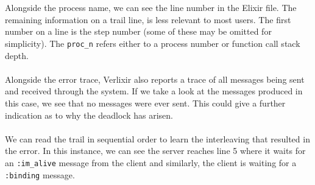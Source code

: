 \\ \\
Alongside the process name, we can see the line number in the Elixir file. The remaining information on a trail line, is less relevant to most users. The first number on a line is the step number (some of these may be omitted for simplicity). The \texttt{proc\_n} refers either to a process number or function call stack depth.
\\ \\
Alongside the error trace, Verlixir also reports a trace of all messages being sent and received through the system. If we take a look at the messages produced in this case, we see that no messages were ever sent. This could give a further indication as to why the deadlock has arisen.
\\ \\
We can read the trail in sequential order to learn the interleaving that resulted in the error. In this instance, we can see the server reaches line 5 where it waits for an \texttt{:im\_alive} message from the client and similarly, the client is waiting for a \texttt{:binding} message.
